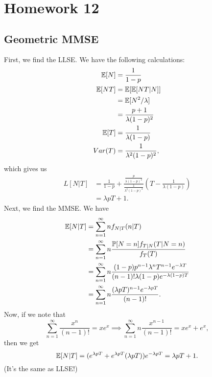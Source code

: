 \section{Homework 12}

\subsection{Geometric MMSE}
First, we find the LLSE. We have the following calculations:
\begin{align*}
    \mathbb{E}[N] &= \frac{1}{1 - p} \\
    \mathbb{E}[NT] &= \mathbb{E}[\mathbb{E}[NT|N]] \\
        &= \mathbb{E}[N^2/\lambda] \\
        &= \frac{p + 1}{\lambda(1 - p)^2} \\
    \mathbb{E}[T] &= \frac{1}{\lambda(1 - p)} \\
    Var(T) &= \frac{1}{\lambda^2(1 - p)^2},
\end{align*}
which gives us
\begin{align*}
    L[N | T] &= \frac{1}{1 - p} + \frac{\frac{p}{\lambda(1 - p)^2}}{\frac{1}{\lambda^2(1 - p)^2}}\left(T - \frac{1}{\lambda(1 - p)}\right) \\
        &= \lambda pT + 1.
\end{align*}
Next, we find the MMSE. We have
\begin{align*}
    \mathbb{E}[N | T] &= \sum_{n = 1}^\infty nf_{N|T}(n|T) \\
        &= \sum_{n = 1}^\infty n\frac{\mathbb{P}[N = n]f_{T|N}(T|N = n)}{f_T(T)} \\
        &= \sum_{n = 1}^\infty n\frac{(1 - p)p^{n - 1}\lambda^{n}T^{n - 1}e^{-\lambda T}}{(n - 1)!\lambda (1 - p)e^{-\lambda(1 - p)T}} \\
        &= \sum_{n = 1}^\infty n\frac{(\lambda pT)^{n - 1}e^{-\lambda pT}}{(n - 1)!}.
\end{align*}
Now, if we note that
\[
\sum_{n = 1}^\infty \frac{x^n}{(n - 1)!} = xe^x \implies \sum_{n = 1}^\infty n\frac{x^{n - 1}}{(n - 1)!} = xe^x + e^x,
\]
then we get
\[
\mathbb{E}[N|T] = (e^{\lambda pT} + e^{\lambda pT}(\lambda pT))e^{-\lambda pT} = \lambda pT + 1.
\]
(It's the same as LLSE!)


